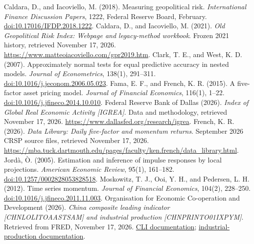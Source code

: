 Caldara, D., and Iacoviello, M. (2018). Measuring geopolitical risk. \textit{International Finance Discussion Papers}, 1222, Federal Reserve Board, February. \href{https://doi.org/10.17016/IFDP.2018.1222}{doi:10.17016/IFDP.2018.1222}.
 Caldara, D., and Iacoviello, M. (2021). \textit{Old Geopolitical Risk Index: Webpage and legacy-method workbook}. Frozen 2021 history, retrieved November 17, 2026. \url{https://www.matteoiacoviello.com/gpr2019.htm}.
 Clark, T. E., and West, K. D. (2007). Approximately normal tests for equal predictive accuracy in nested models. \textit{Journal of Econometrics}, 138(1), 291–311. \href{https://doi.org/10.1016/j.jeconom.2006.05.023}{doi:10.1016/j.jeconom.2006.05.023}.
 Fama, E. F., and French, K. R. (2015). A five-factor asset pricing model. \textit{Journal of Financial Economics}, 116(1), 1–22. \href{https://doi.org/10.1016/j.jfineco.2014.10.010}{doi:10.1016/j.jfineco.2014.10.010}.
 Federal Reserve Bank of Dallas (2026). \textit{Index of Global Real Economic Activity [IGREA]}. Data and methodology, retrieved November 17, 2026. \url{https://www.dallasfed.org/research/igrea}.
 French, K. R. (2026). \textit{Data Library: Daily five-factor and momentum returns}. September 2026 CRSP source files, retrieved November 17, 2026. \url{https://mba.tuck.dartmouth.edu/pages/faculty/ken.french/data_library.html}.
 Jordà, Ò. (2005). Estimation and inference of impulse responses by local projections. \textit{American Economic Review}, 95(1), 161–182. \href{https://doi.org/10.1257/0002828053828518}{doi:10.1257/0002828053828518}.
 Moskowitz, T. J., Ooi, Y. H., and Pedersen, L. H. (2012). Time series momentum. \textit{Journal of Financial Economics}, 104(2), 228–250. \href{https://doi.org/10.1016/j.jfineco.2011.11.003}{doi:10.1016/j.jfineco.2011.11.003}.
 Organisation for Economic Co-operation and Development (2026). \textit{China composite leading indicator [CHNLOLITOAASTSAM] and industrial production [CHNPRINTO01IXPYM]}. Retrieved from FRED, November 17, 2026. \href{https://fred.stlouisfed.org/series/CHNLOLITOAASTSAM}{CLI documentation}; \href{https://fred.stlouisfed.org/series/CHNPRINTO01IXPYM}{industrial-production documentation}.
